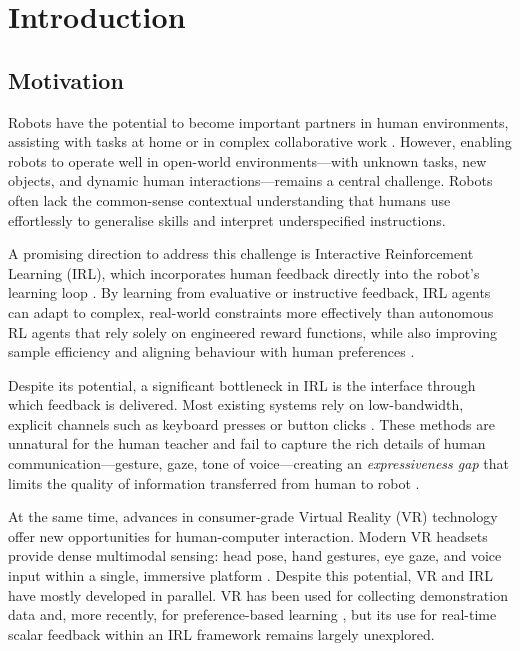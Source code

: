 \documentclass[../report.tex]{subfiles}
\begin{document}
    \section{Introduction}
    \label{sec:introduction}

    \subsection{Motivation}
    \label{sec:introduction:motivation}

    Robots have the potential to become important partners in human environments, assisting with tasks at home or in complex collaborative work \cite{Chetouani2021, Akalin2021}. However, enabling robots to operate well in open-world environments---with unknown tasks, new objects, and dynamic human interactions---remains a central challenge. Robots often lack the common-sense contextual understanding that humans use effortlessly to generalise skills and interpret underspecified instructions.

    A promising direction to address this challenge is Interactive Reinforcement Learning (IRL), which incorporates human feedback directly into the robot's learning loop \cite{Lin2020, BradleyKnox2008}. By learning from evaluative or instructive feedback, IRL agents can adapt to complex, real-world constraints more effectively than autonomous RL agents that rely solely on engineered reward functions, while also improving sample efficiency and aligning behaviour with human preferences \cite{Lin2020}.

    Despite its potential, a significant bottleneck in IRL is the interface through which feedback is delivered. Most existing systems rely on low-bandwidth, explicit channels such as keyboard presses or button clicks \cite{Faulkner2020, Loftin2014}. These methods are unnatural for the human teacher and fail to capture the rich details of human communication---gesture, gaze, tone of voice---creating an \emph{expressiveness gap} that limits the quality of information transferred from human to robot \cite{9794595, Lin2020a}.

    At the same time, advances in consumer-grade Virtual Reality (VR) technology offer new opportunities for human-computer interaction. Modern VR headsets provide dense multimodal sensing: head pose, hand gestures, eye gaze, and voice input within a single, immersive platform \cite{Winkler2022, Luo2024}. Despite this potential, VR and IRL have mostly developed in parallel. VR has been used for collecting demonstration data \cite{10904309, Mosbach2022} and, more recently, for preference-based learning \cite{Heuvel2025}, but its use for real-time scalar feedback within an IRL framework remains largely unexplored.
\end{document}
